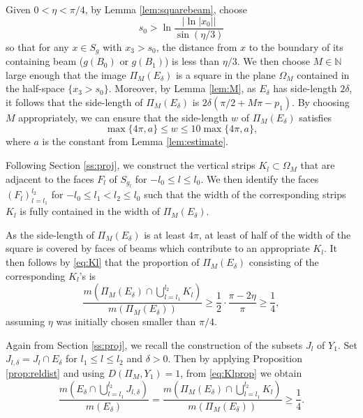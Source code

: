 \documentclass[11pt]{amsart}
\numberwithin{equation}{section}
\theoremstyle{definition}
\theoremstyle{definition}
\theoremstyle{definition}
\newcommand{\N}{\mathbb{N}}
\begin{document}
Given $0<\eta<\pi/4$, by Lemma \ref{lem:squarebeam}, choose
\[ s_0 > \ln \frac{ | \ln |x_0|| }{\sin (\eta / 3)} \]
so that for any $x\in S_g$ with $x_3>s_0$, the distance from $x$ to the boundary of its containing beam ($g(B_0)$ or $g(B_1)$) is less than $\eta / 3$. We then choose $M \in \N$ large enough that the image $\Pi_M(E_{\delta})$ is a square in the plane $\Omega_M$ contained in the half-space $\{x_3>s_0 \}$. Moreover, by Lemma \ref{lem:M}, as $E_{\delta}$ has side-length $2\delta$, it follows that the side-length of $\Pi_M(E_{\delta})$ is $2\delta(\pi/2 + M\pi - p_1)$. By choosing $M$ appropriately, we can ensure that the side-length $w$ of $\Pi_M(E_{\delta})$ satisfies
\begin{equation}
\label{eq:width}
     \max \{ 4\pi , a\}  \leq w \leq 10 \max \{ 4\pi,a\}, 
\end{equation}
where $a$ is the constant from Lemma \ref{lem:estimate}.

Following Section \ref{ss:proj}, we construct the vertical strips $K_l \subset \Omega_M$ that are adjacent to the faces $F_l$ of $S_{g_l}$ for $-l_0\leq l \leq l_0$. We then identify the faces $(F_l)_{l=l_1}^{l_2}$ for $-l_0 \leq l_1 <l_2 \leq l_0$ such that the width of the corresponding strips $K_l$ is fully contained in the width of $\Pi_M(E_{\delta})$.

As the side-length of $\Pi_M(E_{\delta})$ is at least $4\pi$, at least of half of the width of the  square is covered by faces of beams which contribute to an appropriate $K_l$.
It then follows by \eqref{eq:Kl} that the proportion of $\Pi_M(E_{\delta})$ consisting of the corresponding $K_l$'s is
\begin{equation}
    \label{eq:Klprop}
\frac{ m( \Pi_M(E_{\delta}) \cap \bigcup_{l=l_1}^{l_2} K_l ) }{m(\Pi_M(E_{\delta}) )} 
\geq \frac{1}{2} \cdot \frac{ \pi-2\eta}{\pi} \geq \frac{1}{4},
\end{equation}
assuming $\eta$ was initially chosen smaller than $\pi/4$.

Again from Section \ref{ss:proj}, we recall the construction of the subsets $J_l$ of $Y_1$. Set $J_{l,\delta} = J_l \cap E_{\delta}$ for $l_1\leq l \leq l_2$ and $\delta>0$. Then by applying Proposition \ref{prop:reldist} and using $D(\Pi_M,Y_1) = 1$, from \eqref{eq:Klprop} we obtain
\begin{equation}
    \label{eq:Jlprop}
\frac{ m(E_{\delta} \cap \bigcup_{l=l_1}^{l_2} J_{l,\delta}  )}{ m(E_{\delta}) }  = \frac{ m( \Pi_M(E_{\delta}) \cap \bigcup_{l=l_1}^{l_2} K_l ) }{m(\Pi_M(E_{\delta}) )} \geq \frac{1}{4}.
\end{equation}
\end{document}
